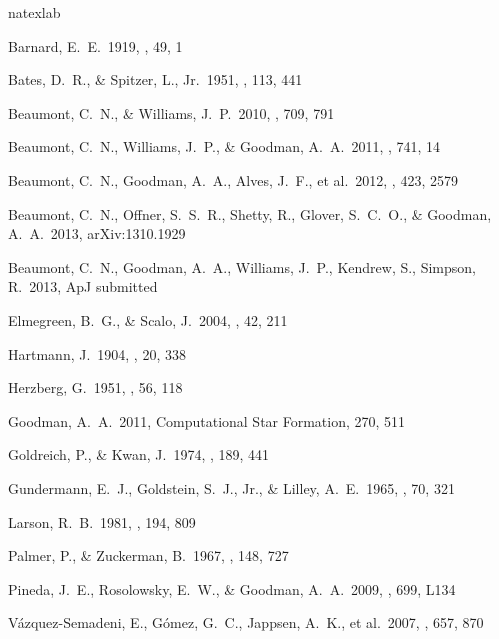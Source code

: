 \begin{thebibliography}{16}
\expandafter\ifx\csname natexlab\endcsname\relax\def\natexlab#1{#1}\fi

 Barnard, E.~E.\ 1919, \apj,
49, 1

 Bates, D.~R., \& Spitzer, L., Jr.\ 1951, \apj, 113, 441

 Beaumont, C.~N., \& Williams, J.~P.\ 2010, \apj, 709, 791


 Beaumont, C.~N.,
Williams, J.~P., \& Goodman, A.~A.\ 2011, \apj, 741, 14


 Beaumont, C.~N.,
Goodman, A.~A., Alves, J.~F., et al.\ 2012, \mnras, 423, 2579

 Beaumont, C.~N.,
Offner, S.~S.~R., Shetty, R., Glover, S.~C.~O.,
\& Goodman, A.~A.\ 2013, arXiv:1310.1929

 Beaumont, C.~N.,
Goodman, A.~A., Williams, J.~P., Kendrew, S., Simpson, R.\ 2013, ApJ submitted

 Elmegreen, B.~G., \& Scalo, J.\ 2004, \araa, 42, 211

 Hartmann, J.\ 1904, \apj, 20,  338

 Herzberg, G.\ 1951, \aj, 56, 118

 Goodman, A.~A.\ 2011,  Computational Star Formation, 270, 511

 Goldreich, P., \& Kwan, J.\ 1974, \apj, 189, 441

 Gundermann, E.~J.,
Goldstein, S.~J., Jr., \& Lilley, A.~E.\ 1965, \aj, 70, 321

 Larson, R.~B.\ 1981, \mnras,
194, 809

 Palmer, P., \& Zuckerman, B.\ 1967, \apj, 148, 727

 Pineda, J.~E.,
Rosolowsky, E.~W., \& Goodman, A.~A.\ 2009, \apjl, 699, L134

V{\'a}zquez-Semadeni, E., G{\'o}mez, G.~C., Jappsen, A.~K., et al.\ 2007,
\apj, 657, 870


\end{thebibliography}

